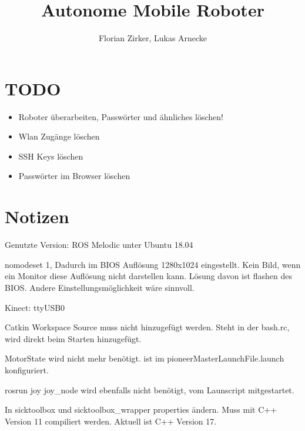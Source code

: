 \documentclass{scrartcl}%
\begin{document}
\titlehead{AMR}%
\subject{Projektbericht}%
\title{Autonome Mobile Roboter}%
\author{Florian Zirker, Lukas Arnecke}%
\publishers{Prof. Dr. Thomas Ihme}%
\maketitle%
\tableofcontents

\section{TODO}
\begin{itemize}
	\item Roboter überarbeiten, Passwörter und ähnliches löschen!
	\item Wlan Zugänge löschen
	\item SSH Keys löschen
	\item Passwörter im Browser löschen
\end{itemize}
\section{Notizen}
Genutzte Version: ROS Melodic unter Ubuntu 18.04

nomodeset 1, Dadurch im BIOS Auflösung 1280x1024 eingestellt. Kein Bild, wenn ein Monitor diese Auflösung nicht darstellen kann. Lösung davon ist flashen des BIOS. Andere Einstellungsmöglichkeit wäre sinnvoll.

Kinect: ttyUSB0

Catkin Workspace Source muss nicht hinzugefügt werden. Steht in der bash.rc, wird direkt beim Starten hinzugefügt.

MotorState wird nicht mehr benötigt. ist im pioneerMasterLaunchFile.launch konfiguriert.

rosrun joy joy\_node wird ebenfalls nicht benötigt, vom Launscript mitgestartet.

In sicktoolbox und sicktoolbox\_wrapper properties ändern. Muss mit C++ Version 11 compiliert werden. Aktuell ist C++ Version 17.
\end{document}
